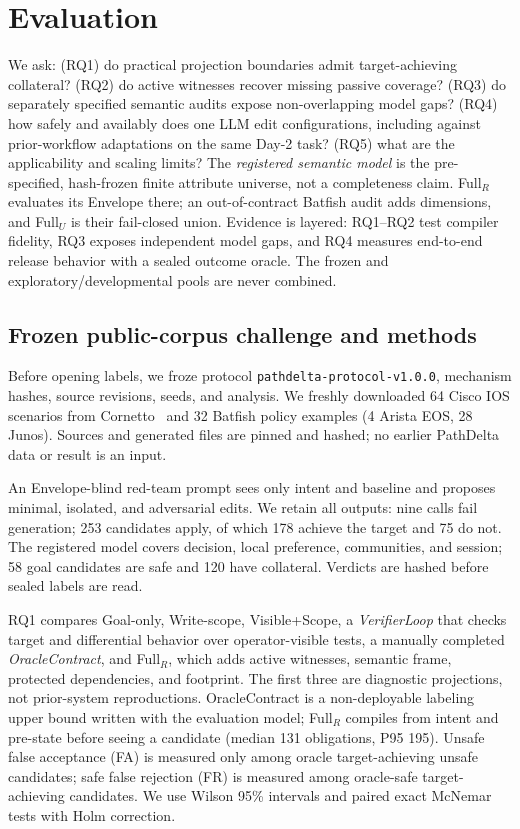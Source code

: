 \section{Evaluation}

We ask: (RQ1) do practical projection boundaries admit target-achieving
collateral? (RQ2) do active witnesses recover missing passive coverage?
(RQ3) do separately specified semantic audits expose non-overlapping model gaps?
(RQ4) how safely and availably does one LLM edit configurations, including
against prior-workflow adaptations on the same Day-2 task? (RQ5) what are
the applicability and scaling limits?  The \emph{registered semantic model} is
the pre-specified, hash-frozen finite attribute universe, not a completeness
claim.  Full$_R$ evaluates its Envelope there; an out-of-contract Batfish audit
adds dimensions, and Full$_U$ is their fail-closed union.  Evidence is layered:
RQ1--RQ2 test compiler fidelity, RQ3 exposes independent model gaps, and RQ4
measures end-to-end release behavior with a sealed outcome oracle.  The frozen
and exploratory/developmental pools are never combined.

\subsection{Frozen public-corpus challenge and methods}

Before opening labels, we froze protocol \texttt{pathdelta-protocol-v1.0.0}, mechanism
hashes, source revisions, seeds, and analysis.  We freshly downloaded 64 Cisco
IOS scenarios from Cornetto~\cite{protogeros2026cornetto} and 32 Batfish policy
examples (4 Arista EOS, 28 Junos).  Sources and generated files are pinned and
hashed; no earlier PathDelta data or result is an input.

An Envelope-blind red-team prompt sees only intent and baseline and proposes
minimal, isolated, and adversarial edits.  We retain all outputs: nine calls
fail generation; 253 candidates apply, of which 178 achieve the target and 75
do not.  The registered model covers decision, local preference, communities,
and session; 58 goal candidates are safe and 120 have collateral.  Verdicts are
hashed before sealed labels are read.

RQ1 compares Goal-only, Write-scope, Visible+Scope, a \emph{VerifierLoop} that
checks target and differential behavior over operator-visible tests, a manually
completed \emph{OracleContract}, and Full$_R$, which
adds active witnesses, semantic frame, protected dependencies, and footprint.
The first three are diagnostic projections, not prior-system reproductions.
OracleContract is a non-deployable labeling upper bound written with the
evaluation model; Full$_R$ compiles from intent and pre-state before seeing a
candidate (median 131 obligations, P95 195).
Unsafe false acceptance (FA) is measured only among oracle target-achieving
unsafe candidates; safe false rejection (FR) is measured among oracle-safe
target-achieving candidates.  We use Wilson 95\% intervals and paired exact
McNemar tests with Holm correction.

